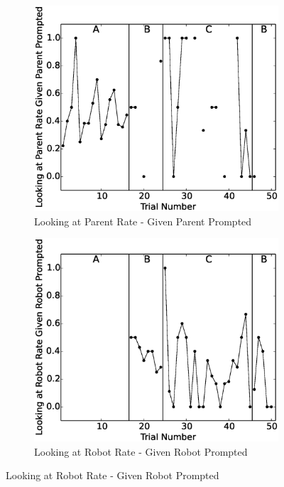 \begin{figure}[h]
	\centering
	\begin{subfigure}[b]{0.49\textwidth}
		\includegraphics[width=1.1\linewidth]{./img/data_analysis/8LookingatParentRateGivenParentPrompted.eps}
		\caption{Looking at Parent Rate - Given Parent Prompted}
		\label{fig:8LookingatParentRateGivenParentPrompted}
	\end{subfigure}
	\hfill
	\begin{subfigure}[b]{0.49\textwidth}
		\includegraphics[width=1.1\linewidth]{./img/data_analysis/9LookingatRobotRateGivenRobotPrompted.eps}
		\caption{Looking at Robot Rate - Given Robot Prompted}
		\label{fig:9LookingatRobotRateGivenRobotPrompted}
	\end{subfigure}%
	

\end{figure}
